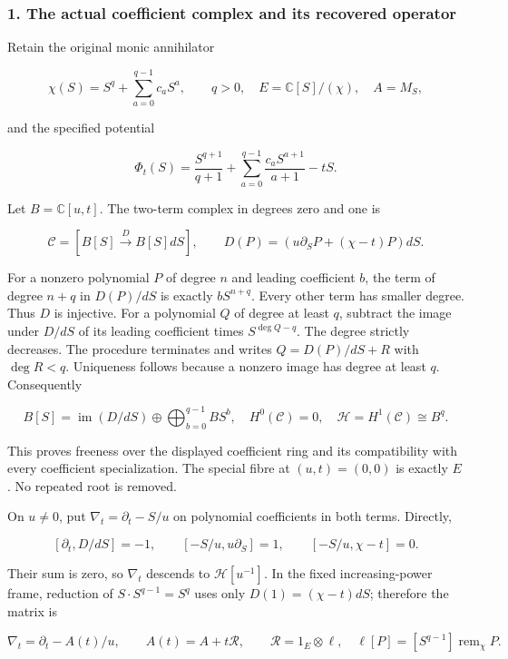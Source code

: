 \subsubsection{1. The actual coefficient complex and its recovered operator}\label{endpoint-purity_review--the-actual-coefficient-complex-and-its-recovered-operator}

Retain the original monic annihilator

\[
\chi(S)=S^q+\sum_{a=0}^{q-1}c_aS^a,\qquad q>0,
\quad E=\mathbb C[S]/(\chi),\quad A=M_S,
\]

and the specified potential

\[
\Phi_t(S)=\frac{S^{q+1}}{q+1}
 +\sum_{a=0}^{q-1}\frac{c_aS^{a+1}}{a+1}-tS.
\tag{DP.1}
\]

Let \(B=\mathbb C[u,t]\). The two-term complex in degrees zero and one is

\[
\mathcal C=[B[S]\xrightarrow{D}B[S]dS],\qquad
D(P)=(u\partial_SP+(\chi-t)P)dS.
\tag{DP.2}
\]

For a nonzero polynomial \(P\) of degree \(n\) and leading coefficient \(b\), the term of degree \(n+q\) in \(D(P)/dS\) is exactly \(bS^{n+q}\). Every other term has smaller degree. Thus \(D\) is injective. For a polynomial \(Q\) of degree at least \(q\), subtract the image under \(D/dS\) of its leading coefficient times \(S^{\deg Q-q}\). The degree strictly decreases. The procedure terminates and writes \(Q=D(P)/dS+R\) with \(\deg R<q\). Uniqueness follows because a nonzero image has degree at least \(q\). Consequently

\[
B[S]=\operatorname{im}(D/dS)\oplus
 \bigoplus_{b=0}^{q-1}B S^b,
\quad H^0(\mathcal C)=0,
\quad \mathcal H=H^1(\mathcal C)\cong B^q.
\tag{DP.3}
\]

This proves freeness over the displayed coefficient ring and its compatibility with every coefficient specialization. The special fibre at \((u,t)=(0,0)\) is exactly \(E\). No repeated root is removed.

On \(u\ne0\), put \(\nabla_t=\partial_t-S/u\) on polynomial coefficients in both terms. Directly,

\[
[\partial_t,D/dS]=-1,
\qquad [-S/u,u\partial_S]=1,
\qquad [-S/u,\chi-t]=0.
\]

Their sum is zero, so \(\nabla_t\) descends to \(\mathcal H[u^{-1}]\). In the fixed increasing-power frame, reduction of \(S\cdot S^{q-1}=S^q\) uses only \(D(1)=(\chi-t)dS\); therefore the matrix is

\[
\nabla_t=\partial_t-A(t)/u,
\qquad A(t)=A+t\mathcal R,
\qquad \mathcal R=1_E\otimes\ell,
\quad \ell[P]=[S^{q-1}]\operatorname{rem}_{\chi}P.
\tag{DP.4}
\]

